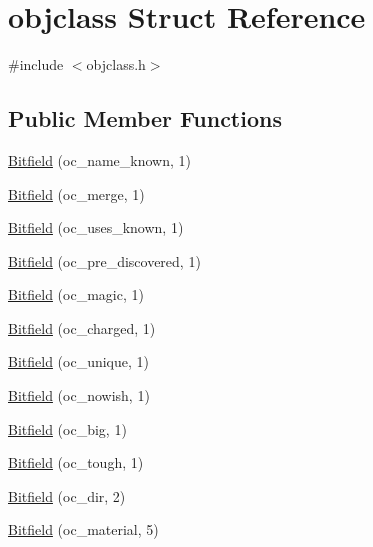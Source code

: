 \hypertarget{structobjclass}{\section{objclass Struct Reference}
\label{structobjclass}
}


{\ttfamily \#include $<$objclass.\+h$>$}

\subsection*{Public Member Functions}
\begin{DoxyCompactItemize}
\item 
\hyperlink{structobjclass_ae116c494e8b7d7b258ef02315e1cdf4a}{Bitfield} (oc\+\_\+name\+\_\+known, 1)
\item 
\hyperlink{structobjclass_aab61ee2789985f4e06d0ffbc433bce00}{Bitfield} (oc\+\_\+merge, 1)
\item 
\hyperlink{structobjclass_a02b238cdd67586609809d38fde9b0c73}{Bitfield} (oc\+\_\+uses\+\_\+known, 1)
\item 
\hyperlink{structobjclass_a271d097882a495d24bfa8c7d1e5ae6bd}{Bitfield} (oc\+\_\+pre\+\_\+discovered, 1)
\item 
\hyperlink{structobjclass_af0887257c7d5a6b24f698272c3501595}{Bitfield} (oc\+\_\+magic, 1)
\item 
\hyperlink{structobjclass_aace154afaec50edb17a42f40e3485707}{Bitfield} (oc\+\_\+charged, 1)
\item 
\hyperlink{structobjclass_a31c38ccfd40eaa617eae5613bf7934af}{Bitfield} (oc\+\_\+unique, 1)
\item 
\hyperlink{structobjclass_a29a753c4b44d63d3b2724a97c64b27ee}{Bitfield} (oc\+\_\+nowish, 1)
\item 
\hyperlink{structobjclass_aa51c58831a88b111e50ee9e2e5e61ed6}{Bitfield} (oc\+\_\+big, 1)
\item 
\hyperlink{structobjclass_a1b0188ca449e2635bcd4c46b1052726e}{Bitfield} (oc\+\_\+tough, 1)
\item 
\hyperlink{structobjclass_ad8a536792e4baaaa4e5f4d8082070cc6}{Bitfield} (oc\+\_\+dir, 2)
\item 
\hyperlink{structobjclass_adc9733ba46b7ca60e32de89d69344d26}{Bitfield} (oc\+\_\+material, 5)
\end{DoxyCompactItemize}
